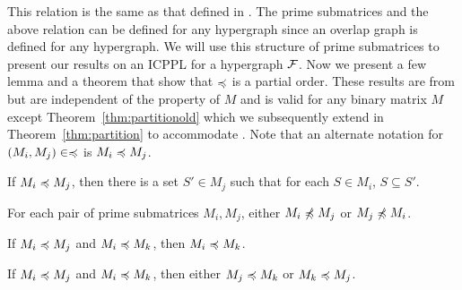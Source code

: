 
This relation is the same as that defined in \cite{nsnrs09}. The prime
submatrices and the above relation can be defined for any hypergraph
since an overlap graph is defined for any hypergraph. We will use this
structure of prime submatrices to present our results on an ICPPL for
a hypergraph ${\cal F}$.  Now we present a few lemma and a theorem that
show that $\preccurlyeq$ is a partial order.  These results are from
\cite{nsnrs09} but are independent of the \COP property of $M$ and is
valid for any binary matrix $M$ except Theorem~\ref{thm:partitionold}
which we subsequently extend in Theorem~\ref{thm:partition} to
accommodate \ICPPL.  Note that an alternate notation for $(M_i,M_j)
\in \preccurlyeq$ is $M_i \preccurlyeq M_j$.


\begin{lemma} %
  \label{lem:containment} If %
  $M_i \preccurlyeq M_j$, then there is a set $S' \in M_j$ such that for
  each $S \in M_i$, $S \subseteq S'$.
\end{lemma}
\begin{lemma} %
  For each pair of prime submatrices $M_i, M_j$, either $M_i \not\preccurlyeq M_j$
  or $M_j \not\preccurlyeq M_i$.
\end{lemma}
\begin{lemma} %
  If $M_i \preccurlyeq M_j$ and $M_i \preccurlyeq M_k$,
  then $M_i \preccurlyeq M_k$.
\end{lemma}
\begin{lemma} %
  If $M_i \preccurlyeq M_j$ and $M_i \preccurlyeq M_k$,
  then either $M_j \preccurlyeq M_k$ or $M_k \preccurlyeq M_j$.
\end{lemma}

